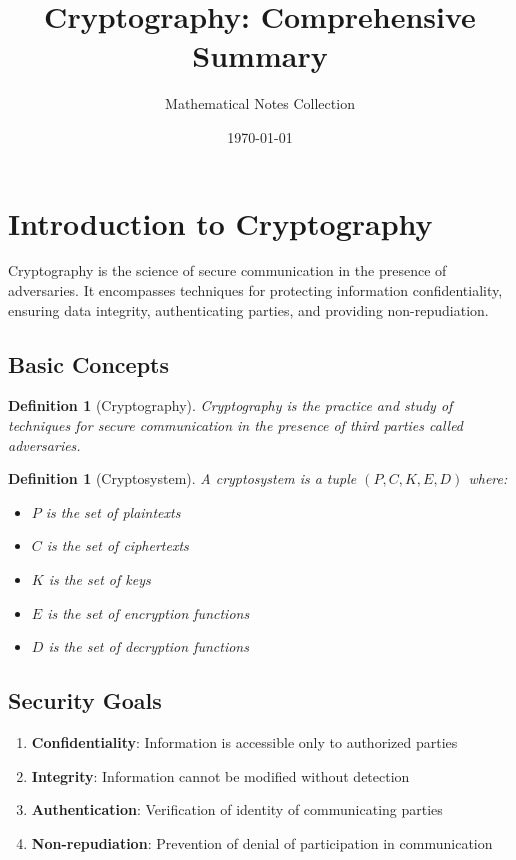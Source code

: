 \documentclass[11pt,a4paper]{article}
\title{Cryptography: Comprehensive Summary}
\author{Mathematical Notes Collection}
\date{\today}
\newtheorem{definition}[theorem]{Definition}
\begin{document}
\maketitle
\tableofcontents
\newpage

\section{Introduction to Cryptography}

Cryptography is the science of secure communication in the presence of adversaries. It encompasses techniques for protecting information confidentiality, ensuring data integrity, authenticating parties, and providing non-repudiation.

\subsection{Basic Concepts}

\begin{definition}[Cryptography]
Cryptography is the practice and study of techniques for secure communication in the presence of third parties called adversaries.
\end{definition}

\begin{definition}[Cryptosystem]
A cryptosystem is a tuple $(P, C, K, E, D)$ where:
\begin{itemize}
\item $P$ is the set of plaintexts
\item $C$ is the set of ciphertexts
\item $K$ is the set of keys
\item $E$ is the set of encryption functions
\item $D$ is the set of decryption functions
\end{itemize}
\end{definition}

\subsection{Security Goals}

\begin{enumerate}
\item \textbf{Confidentiality}: Information is accessible only to authorized parties
\item \textbf{Integrity}: Information cannot be modified without detection
\item \textbf{Authentication}: Verification of identity of communicating parties
\item \textbf{Non-repudiation}: Prevention of denial of participation in communication
\end{enumerate}
\end{document}
